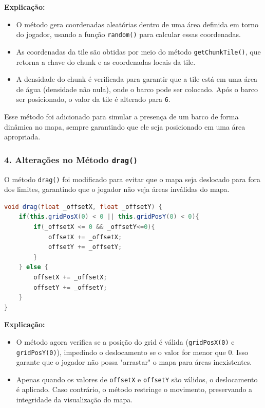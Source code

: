\documentclass[
	12pt,				%
	oneside,			%
	a4paper,			%
	english,			%
	brazil,				%
	]{abntex2}
\begin{document}
{\textbf{Explicação:}
\begin{itemize}
    \item O método gera coordenadas aleatórias dentro de uma área definida em torno do jogador, usando a função \texttt{random()} para calcular essas coordenadas.
    \item As coordenadas da tile são obtidas por meio do método \texttt{getChunkTile()}, que retorna a chave do chunk e as coordenadas locais da tile.
    \item A densidade do chunk é verificada para garantir que a tile está em uma área de água (densidade não nula), onde o barco pode ser colocado. Após o barco ser posicionado, o valor da tile é alterado para \texttt{6}.
\end{itemize}

Esse método foi adicionado para simular a presença de um barco de forma dinâmica no mapa, sempre garantindo que ele seja posicionado em uma área apropriada.

\subsubsection{4. Alterações no Método \texttt{drag()}}

O método \texttt{drag()} foi modificado para evitar que o mapa seja deslocado para fora dos limites, garantindo que o jogador não veja áreas inválidas do mapa.

\begin{lstlisting}[language=Java, caption=Método \texttt{drag()} modificado para evitar deslocamentos indevidos.]
void drag(float _offsetX, float _offsetY) {
    if(this.gridPosX(0) < 0 || this.gridPosY(0) < 0){
        if(_offsetX <= 0 && _offsetY<=0){
            offsetX += _offsetX;
            offsetY += _offsetY;
        }
    } else {
        offsetX += _offsetX;
        offsetY += _offsetY;
    }
}
\end{lstlisting}

\textbf{Explicação:}
\begin{itemize}
    \item O método agora verifica se a posição do grid é válida (\texttt{gridPosX(0)} e \texttt{gridPosY(0)}), impedindo o deslocamento se o valor for menor que 0. Isso garante que o jogador não possa "arrastar" o mapa para áreas inexistentes.
    \item Apenas quando os valores de \texttt{offsetX} e \texttt{offsetY} são válidos, o deslocamento é aplicado. Caso contrário, o método restringe o movimento, preservando a integridade da visualização do mapa.
\end{itemize}

}
\end{document}
